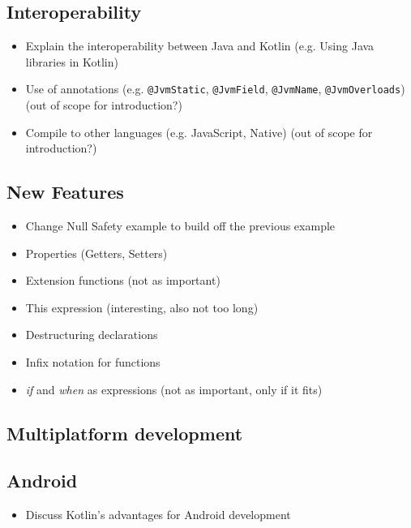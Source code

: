 \documentclass[a4paper, 11pt]{article}
\begin{document}
\subsection{Interoperability}
  \begin{itemize}
    \item Explain the interoperability between Java and Kotlin (e.g. Using Java libraries in Kotlin)
    \item Use of annotations (e.g. \texttt{@JvmStatic}, \texttt{@JvmField}, \texttt{@JvmName}, \texttt{@JvmOverloads}) (out of scope for introduction?)
    \item Compile to other languages (e.g. JavaScript, Native) (out of scope for introduction?)
  \end{itemize}

\subsection{New Features}
\begin{itemize}
  \item Change Null Safety example to build off the previous example
  \item Properties (Getters, Setters)
  \item Extension functions (not as important)
  \item This expression (interesting, also not too long)
  \item Destructuring declarations
  \item Infix notation for functions
  \item \textit{if} and \textit{when} as expressions (not as important, only if it fits)
\end{itemize}

\subsection{Multiplatform development}
\subsection{Android}

\begin{itemize}
  \item Discuss Kotlin's advantages for Android development
\end{itemize}

\newpage
\printbibliography[]
\end{document}
